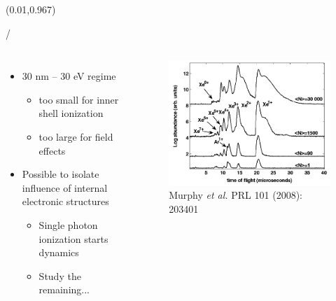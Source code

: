 \documentclass{beamer}
\makeatletter
\newcommand{\framenumber}{
\begin{textblock}{0}(0.01,0.967)
\begin{scriptsize}
{\color{gray}\insertframenumber/\inserttotalframenumber}
\end{scriptsize}
\end{textblock}
}
\makeatother
\begin{document}
\begin{frame}{}\framenumber
\begin{columns}
		\begin{itemize}
		\item 30 nm -- 30 eV regime
			\begin{itemize}
			\item too small for inner shell ionization
			\item too large for field effects
			\end{itemize}
		\item Possible to isolate influence of internal electronic structures
		\begin{itemize}
			\item Single photon ionization starts dynamics
			\item Study the remaining...
		\end{itemize}
		\end{itemize}

		\begin{figure}
			\includegraphics[width=\textwidth]{figures/Murphy2008_fig3}
			\caption{{\tiny Murphy \textit{et al.} PRL 101 (2008): 203401}}
		\end{figure}
\end{columns}
\end{frame}
\end{document}
